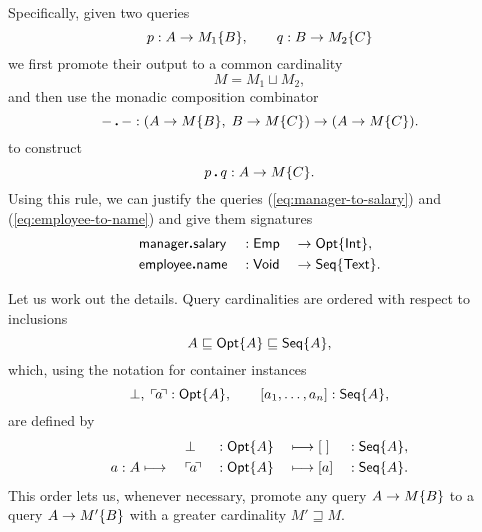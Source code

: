 Specifically, given two queries
\begin{equation*}
    p : A \to M_1{\left\{B\right\}}, \qquad q : B \to M_2{\left\{C\right\}}
\end{equation*}
we first promote their output to a common cardinality
\begin{equation*}
    M = M_1 \sqcup M_2,
\end{equation*}
and then use the monadic composition combinator
\begin{equation*}
    {-}\,\boldsymbol{.}\,{-}: (A \to M{\left\{B\right\}},\; B \to M{\left\{C\right\}}) \to (A \to M{\left\{C\right\}}).
\end{equation*}
to construct
\begin{equation*}
    p\,\boldsymbol{.}\,q : A \to M{\left\{C\right\}}.
\end{equation*}
Using this rule, we can justify the queries (\ref{eq:manager-to-salary}) and
(\ref{eq:employee-to-name}) and give them signatures
\begin{alignat*}{3}
    & \mathsf{manager}\boldsymbol{.}\mathsf{salary} && : \mathsf{Emp} && \to \mathsf{Opt}{\left\{\mathsf{Int}\right\}}, \\
    & \mathsf{employee}\boldsymbol{.}\mathsf{name} && : \mathsf{Void} && \to \mathsf{Seq}{\left\{\mathsf{Text}\right\}}.
\end{alignat*}

Let us work out the details.  Query cardinalities are ordered with respect to
inclusions
\begin{equation*}
    A \sqsubseteq \mathsf{Opt}{\left\{A\right\}} \sqsubseteq \mathsf{Seq}{\left\{A\right\}},
\end{equation*}
which, using the notation for container instances
\begin{equation*}
    \bot,\; \ulcorner\!a\!\urcorner : \mathsf{Opt}{\left\{A\right\}}, \qquad [a_1,\ldots,a_n] : \mathsf{Seq}{\left\{A\right\}},
\end{equation*}
are defined by
\begin{alignat*}{5}
    & \; && \bot && : \mathsf{Opt}{\left\{A\right\}} && \longmapsto [\;] && : \mathsf{Seq}{\left\{A\right\}}, \\
    & a : A \longmapsto\ && \ulcorner\!a\!\urcorner && : \mathsf{Opt}{\left\{A\right\}} && \longmapsto [a] && : \mathsf{Seq}{\left\{A\right\}}.
\end{alignat*}
This order lets us, whenever necessary, promote any query $A\to M{\left\{B\right\}}$ to
a query $A\to M'{\left\{B\right\}}$ with a greater cardinality $M' \sqsupseteq M$.

